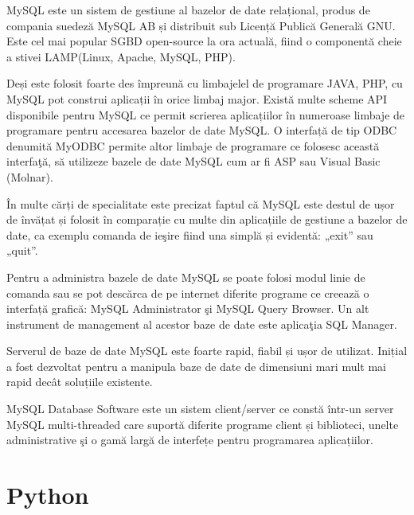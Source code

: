 \par MySQL este un sistem de gestiune al bazelor de date relațional, produs de compania suedeză MySQL AB și distribuit sub Licență Publică Generală GNU. Este cel mai popular SGBD open-source la ora actuală, fiind o componentă cheie a stivei LAMP(Linux, Apache, MySQL, PHP). 
\par Deși este folosit foarte des împreună cu limbajelel de programare JAVA, PHP, cu MySQL pot construi aplicații în orice limbaj major. Există multe scheme API disponibile pentru MySQL ce permit scrierea aplicațiilor în numeroase limbaje de programare pentru accesarea bazelor de date MySQL. O interfață de tip ODBC denumită MyODBC permite altor limbaje de programare ce folosesc această interfaţă, să utilizeze bazele de date MySQL cum ar fi ASP sau Visual Basic  (Molnar). 
\par În multe cărți de specialitate este precizat faptul că MySQL este destul de ușor de învățat și folosit în comparație cu multe din aplicațiile de gestiune a bazelor de date, ca exemplu comanda de ieşire fiind una simplă și evidentă: „exit” sau „quit”. 
\par Pentru a administra bazele de date MySQL se poate folosi modul linie de comanda sau se pot descărca de pe internet diferite programe ce creează o interfață grafică: MySQL Administrator şi MySQL Query Browser. Un alt instrument de management al acestor baze de date este aplicaţia SQL Manager. 
\par Serverul de baze de date MySQL este foarte rapid, fiabil și ușor de utilizat. Inițial a fost dezvoltat pentru a manipula baze de date de dimensiuni mari mult mai rapid decât soluțiile existente. 
\par MySQL Database Software este un sistem client/server ce constă într-un server MySQL multi-threaded care suportă diferite programe client și biblioteci, unelte administrative şi o gamă largă de interfețe pentru programarea aplicațiilor.
 
\section{Python}
\label{sec:ch3sec4}

